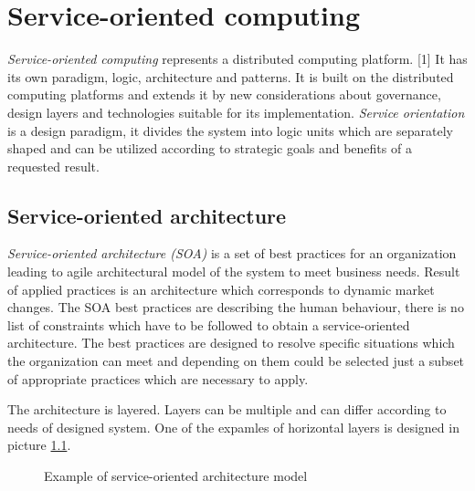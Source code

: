 \chapter{Service-oriented computing}
\label{chap:service-oriented computing}
\emph{Service-oriented computing} represents a distributed computing platform. [1] It has its own paradigm, logic, architecture and patterns. It is built on the distributed computing platforms and extends it by new considerations about governance, design layers and technologies suitable for its implementation.
\emph{Service orientation} is a design paradigm, it divides the system into logic units which are separately shaped and can be utilized according to strategic goals and benefits of a requested result.

\section{Service-oriented architecture}
\emph{Service-oriented architecture (SOA)} is a set of best practices for an organization leading to agile architectural model of the system to meet business needs. Result of applied practices is an architecture which corresponds to dynamic market changes. The SOA best practices are describing the human behaviour, there is no list of constraints which have to be followed to obtain a service-oriented architecture. The best practices are designed to resolve specific situations which the organization can meet and depending on them could be selected just a subset of appropriate practices which are necessary to apply.

The architecture is layered. Layers can be multiple and can differ according to needs of designed system. One of the expamles of horizontal layers is designed in picture \ref{fig:soa-architecture}.

\begin{figure}[htp] 
\caption{Example of service-oriented architecture model}
\label{fig:soa-architecture}
\end{figure}  

